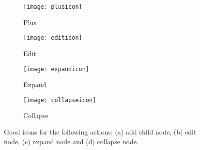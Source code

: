 \begin{figure}[H]
	\centering
	\begin{subfigure}{.2\textwidth}
  		\centering
  		\texttt{[image: plusicon]}
  		\caption{Plus}
  		\label{fig:plusicon}
	\end{subfigure}%
	\begin{subfigure}{.2\textwidth}
  		\centering
  		\texttt{[image: editicon]}
  		\caption{Edit}
  		\label{fig:editicon}
	\end{subfigure}
	\begin{subfigure}{.2\textwidth}
  		\centering
  		\texttt{[image: expandicon]}
  		\caption{Expand}
  		\label{fig:expandicon}
	\end{subfigure}
	\begin{subfigure}{.2\textwidth}
  		\centering
  		\texttt{[image: collapseicon]}
  		\caption{Collapse}
  		\label{fig:collapseicon}
	\end{subfigure}
	\caption{Good icons for the following actions: (a) add child node, (b) edit node, (c) expand node and (d) collapse node.}
	\label{fig:icons}
\end{figure}